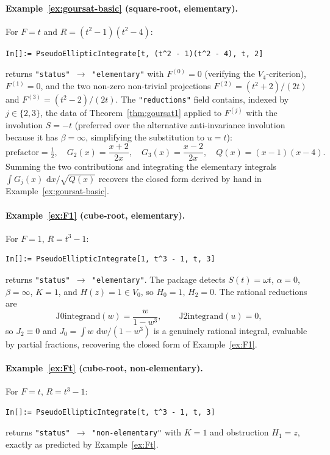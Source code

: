 \documentclass[11pt,a4paper]{article}
\theoremstyle{plain}
\theoremstyle{definition}
\theoremstyle{remark}
\renewcommand{\d}{\,\mathrm{d}}
\begin{document}
\paragraph{Example~\ref{ex:goursat-basic} (square-root, elementary).} For $F=t$ and $R=(t^2-1)(t^2-4)$:
\begin{lstlisting}[basicstyle=\footnotesize\ttfamily,frame=none]
In[]:= PseudoEllipticIntegrate[t, (t^2 - 1)(t^2 - 4), t, 2]
\end{lstlisting}
returns \texttt{"status"\,$\to$\,"elementary"} with $F^{(0)} = 0$ (verifying the $V_4$-criterion), $F^{(1)} = 0$, and the two non-zero non-trivial projections $F^{(2)} = (t^2+2)/(2t)$ and $F^{(3)} = (t^2-2)/(2t)$. The \texttt{"reductions"} field contains, indexed by $j\in\{2,3\}$, the data of Theorem~\ref{thm:goursat1} applied to $F^{(j)}$ with the involution $S = -t$ (preferred over the alternative anti-invariance involution because it has $\beta=\infty$, simplifying the substitution to $u=t$):
\[
  \text{prefactor} = \tfrac{1}{2},\quad
  G_2(x) = \frac{x+2}{2x},\quad G_3(x) = \frac{x-2}{2x},\quad
  Q(x) = (x-1)(x-4).
\]
Summing the two contributions and integrating the elementary integrals $\int G_j(x)\,\d x/\sqrt{Q(x)}$ recovers the closed form derived by hand in Example~\ref{ex:goursat-basic}.

\paragraph{Example~\ref{ex:F1} (cube-root, elementary).} For $F=1$, $R=t^3-1$:
\begin{lstlisting}[basicstyle=\footnotesize\ttfamily,frame=none]
In[]:= PseudoEllipticIntegrate[1, t^3 - 1, t, 3]
\end{lstlisting}
returns \texttt{"status"\,$\to$\,"elementary"}. The package detects $S(t) = \omega t$, $\alpha=0$, $\beta=\infty$, $K=1$, and $H(z) = 1 \in V_0$, so $H_0 = 1$, $H_2 = 0$. The rational reductions are
\[
  \text{J0integrand}(w) = \frac{w}{1-w^3},\qquad \text{J2integrand}(u) = 0,
\]
so $J_2 \equiv 0$ and $J_0 = \int w\,\d w/(1-w^3)$ is a genuinely rational integral, evaluable by partial fractions, recovering the closed form of Example~\ref{ex:F1}.

\paragraph{Example~\ref{ex:Ft} (cube-root, non-elementary).} For $F=t$, $R=t^3-1$:
\begin{lstlisting}[basicstyle=\footnotesize\ttfamily,frame=none]
In[]:= PseudoEllipticIntegrate[t, t^3 - 1, t, 3]
\end{lstlisting}
returns \texttt{"status"\,$\to$\,"non-elementary"} with $K=1$ and obstruction $H_1 = z$, exactly as predicted by Example~\ref{ex:Ft}.
\end{document}
